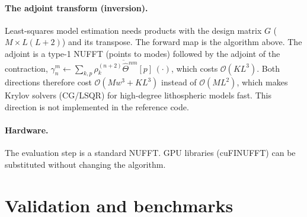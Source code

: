 \documentclass[11pt,a4paper]{article}
\theoremstyle{remark}
\newcommand{\Th}{\Theta}
\newcommand{\Oh}{\mathcal{O}}
\begin{document}
\paragraph{The adjoint transform (inversion).} Least-squares model estimation needs products with
the design matrix $G$ ($M\times L(L+2)$) and its transpose. The forward map is the algorithm
above. The adjoint is a type-1 NUFFT (points to modes) followed by the adjoint of the contraction,
$\gamma_n^m\leftarrow\sum_{k,p}\overline{\rho_k^{(n+2)}\hat\Th^{nm}[p]}\,(\cdot)$, which costs
$\Oh(KL^3)$. Both directions therefore cost $\Oh(Mw^3+KL^3)$ instead of $\Oh(ML^2)$, which makes
Krylov solvers (CG/LSQR) for high-degree lithospheric models fast. This direction is not
implemented in the reference code.

\paragraph{Hardware.} The evaluation step is a standard NUFFT. GPU libraries (cuFINUFFT) can be
substituted without changing the algorithm.

\section{Validation and benchmarks}\label{sec:results}
\end{document}
